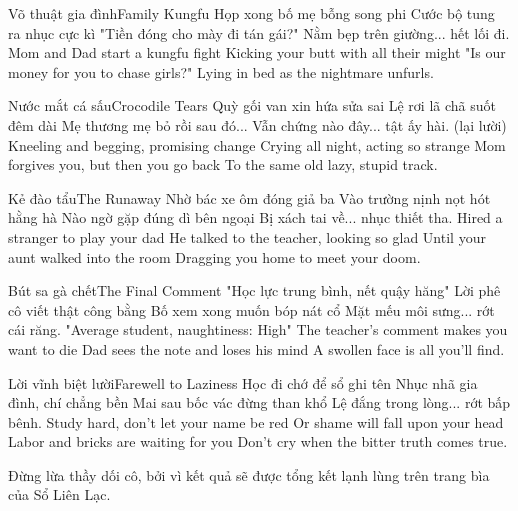 \begin{tutuyetbox}{Võ thuật gia đình}{Family Kungfu}
Họp xong bố mẹ bỗng song phi
Cước bộ tung ra nhục cực kì
"Tiền đóng cho mày đi tán gái?"
Nằm bẹp trên giường... hết lối đi.
\tcblower
Mom and Dad start a kungfu fight
Kicking your butt with all their might
"Is our money for you to chase girls?"
Lying in bed as the nightmare unfurls.
\end{tutuyetbox}

\begin{tutuyetbox}{Nước mắt cá sấu}{Crocodile Tears}
Quỳ gối van xin hứa sửa sai
Lệ rơi lã chã suốt đêm dài
Mẹ thương mẹ bỏ rồi sau đó...
Vẫn chứng nào đây... tật ấy hài. (lại lười)
\tcblower
Kneeling and begging, promising change
Crying all night, acting so strange
Mom forgives you, but then you go back
To the same old lazy, stupid track.
\end{tutuyetbox}

\begin{tutuyetbox}{Kẻ đào tẩu}{The Runaway}
Nhờ bác xe ôm đóng giả ba
Vào trường nịnh nọt hót hằng hà
Nào ngờ gặp đúng dì bên ngoại
Bị xách tai về... nhục thiết tha.
\tcblower
Hired a stranger to play your dad
He talked to the teacher, looking so glad
Until your aunt walked into the room
Dragging you home to meet your doom.
\end{tutuyetbox}

\begin{tutuyetbox}{Bút sa gà chết}{The Final Comment}
"Học lực trung bình, nết quậy hăng"
Lời phê cô viết thật công bằng
Bố xem xong muốn bóp nát cổ
Mặt mếu môi sưng... rớt cái răng.
\tcblower
"Average student, naughtiness: High"
The teacher's comment makes you want to die
Dad sees the note and loses his mind
A swollen face is all you'll find.
\end{tutuyetbox}

\begin{tutuyetbox}{Lời vĩnh biệt lười}{Farewell to Laziness}
Học đi chớ để sổ ghi tên
Nhục nhã gia đình, chí chẳng bền
Mai sau bốc vác đừng than khổ
Lệ đắng trong lòng... rớt bấp bênh.
\tcblower
Study hard, don't let your name be red
Or shame will fall upon your head
Labor and bricks are waiting for you
Don't cry when the bitter truth comes true.
\end{tutuyetbox}

\begin{ghichu}
Đừng lừa thầy dối cô, bởi vì kết quả sẽ được tổng kết lạnh lùng trên trang bìa của Sổ Liên Lạc.
\end{ghichu}